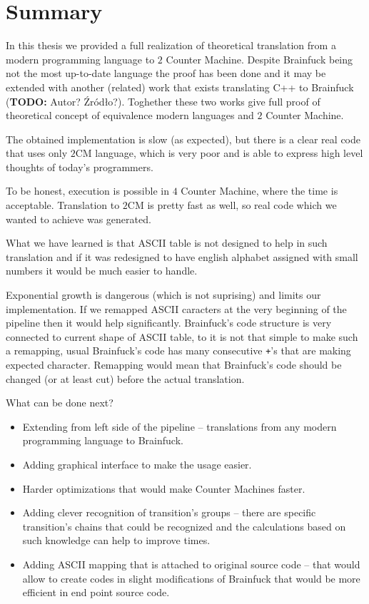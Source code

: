 \documentclass[english,shortabstract,mgr]{iithesis}
\newcommand{\todo}[1]{\textbf{TODO:} #1}
\begin{document}
\chapter{Summary}


In this thesis we provided a full realization of theoretical translation
from a modern programming language to $2$ Counter Machine. Despite Brainfuck
being not the most up-to-date language the proof has been done and it may
be extended with another (related) work that exists translating C++
to Brainfuck (\todo{Autor? Źródło?}). Toghether these two works give full
proof of theoretical concept of equivalence modern languages and $2$ Counter
Machine.

The obtained implementation is slow (as expected), but there is a clear real
code that uses only $2$CM language, which is very poor and is able to express
high level thoughts of today's programmers.

To be honest, execution is possible in $4$ Counter Machine, where the time is
acceptable. Translation to $2$CM is pretty fast as well, so real code which
we wanted to achieve was generated.

What we have learned is that ASCII table is not designed to help in such
translation and if it was redesigned to have english alphabet assigned
with small numbers it would be much easier to handle.

Exponential growth is dangerous (which is not suprising) and limits our implementation.
If we remapped ASCII caracters at the very beginning of the pipeline
then it would help significantly. Brainfuck's code structure is very connected
to current shape of ASCII table, to it is not that simple to make such a remapping,
usual Brainfuck's code has many consecutive \texttt{+}'s that are making
expected character. Remapping would mean that Brainfuck's code should be changed
(or at least cut) before the actual translation.

What can be done next?
\begin{itemize}
  \item Extending from left side of the pipeline -- translations from any modern
      programming language to Brainfuck.
  \item Adding graphical interface to make the usage easier.
  \item Harder optimizations that would make Counter Machines faster.
  \item Adding clever recognition of transition's groups -- there are specific
      transition's chains that could be recognized and the calculations
      based on such knowledge can help to improve times.
  \item Adding ASCII mapping that is attached to original source code -- that
      would allow to create codes in slight modifications of Brainfuck that
      would be more efficient in end point source code.
\end{itemize}
\end{document}
